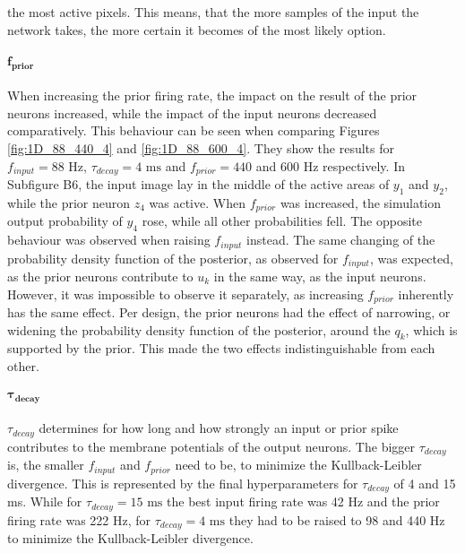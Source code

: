 the most active pixels. This means, that the more samples of the input the network takes, the more certain it becomes of the most likely option.

\paragraph{$\mathbf{f_{prior}}$} When increasing the prior firing rate, the impact on the result of the prior neurons increased, while the impact of the input neurons decreased comparatively. This behaviour can be seen when comparing Figures \ref{fig:1D_88_440_4} and \ref{fig:1D_88_600_4}. They show the results for $f_{input} = 88\text{ Hz}$, $\tau_{decay} = 4\text{ ms}$ and $f_{prior} = 440$ and $600\text{ Hz}$ respectively. In Subfigure B6, the input image lay in the middle of the active areas of $y_1$ and $y_2$, while the prior neuron $z_4$ was active. When $f_{prior}$ was increased, the simulation output probability of $y_4$ rose, while all other probabilities fell. The opposite behaviour was observed when raising $f_{input}$ instead. The same changing of the probability density function of the posterior, as observed for $f_{input}$, was expected, as the prior neurons contribute to $u_k$ in the same way, as the input neurons. However, it was impossible to observe it separately, as increasing $f_{prior}$ inherently has the same effect. Per design, the prior neurons had the effect of narrowing, or widening the probability density function of the posterior, around the $q_k$, which is supported by the prior. This made the two effects indistinguishable from each other.

\paragraph{$\boldsymbol{\tau_{decay}}$} $\tau_{decay}$ determines for how long and how strongly an input or prior spike contributes to the membrane potentials of the output neurons. The bigger $\tau_{decay}$ is, the smaller $f_{input}$ and $f_{prior}$ need to be, to minimize the Kullback-Leibler divergence. This is represented by the final hyperparameters for $\tau_{decay}$ of 4 and 15 ms. While for $\tau_{decay} = 15\text{ ms}$ the best input firing rate was 42 Hz and the prior firing rate was 222 Hz, for $\tau_{decay} = 4\text{ ms}$ they had to be raised to 98 and 440 Hz to minimize the Kullback-Leibler divergence.

